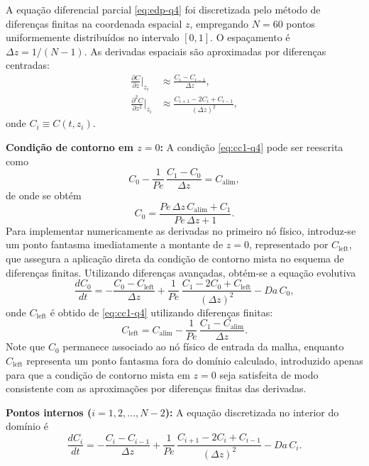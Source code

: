 \documentclass{article}
\begin{document}
A equação diferencial parcial \eqref{eq:edp-q4} foi discretizada pelo método de diferenças finitas na coordenada espacial $z$, empregando $N = 60$ pontos uniformemente distribuídos no intervalo $[0,1]$. O espaçamento é $\Delta z = 1/(N-1)$. As derivadas espaciais são aproximadas por diferenças centradas:
\begin{align}
  \frac{\partial C}{\partial z}\bigg|_{z_i} &\approx \frac{C_{i} - C_{i-1}}{\Delta z}, \label{eq:dz-q4} \\
  \frac{\partial^2 C}{\partial z^2}\bigg|_{z_i} &\approx \frac{C_{i+1} - 2C_i + C_{i-1}}{(\Delta z)^2}, \label{eq:d2z-q4}
\end{align}
onde $C_i \equiv C(t,z_i)$.

\textbf{Condição de contorno em $z=0$:} A condição \eqref{eq:cc1-q4} pode ser reescrita como
\begin{equation*}
  C_0 - \frac{1}{Pe}\,\frac{C_1 - C_0}{\Delta z} = C_{\text{alim}},
\end{equation*}
de onde se obtém
\begin{equation}
  C_0 = \frac{Pe\,\Delta z\,C_{\text{alim}} + C_1}{Pe\,\Delta z + 1}. \label{eq:c0-q4}
\end{equation}
Para implementar numericamente as derivadas no primeiro nó físico, introduz-se um ponto fantasma imediatamente a montante de $z=0$, representado por $C_{\text{left}}$, que assegura a aplicação direta da condição de contorno mista no esquema de diferenças finitas. Utilizando diferenças avançadas, obtém-se a equação evolutiva
\begin{equation}
  \frac{dC_0}{dt} = -\frac{C_0 - C_{\text{left}}}{\Delta z} + \frac{1}{Pe}\,\frac{C_1 - 2C_0 + C_{\text{left}}}{(\Delta z)^2} - Da\,C_0, \label{eq:dc0-q4}
\end{equation}
onde $C_{\text{left}}$ é obtido de \eqref{eq:cc1-q4} utilizando diferenças finitas:
\begin{equation}
  C_{\text{left}} = C_{\text{alim}} - \frac{1}{Pe}\,\frac{C_1 - C_{\text{alim}}}{\Delta z}. \label{eq:cleft-q4}
\end{equation}
Note que $C_0$ permanece associado ao nó físico de entrada da malha, enquanto $C_{\text{left}}$ representa um ponto fantasma fora do domínio calculado, introduzido apenas para que a condição de contorno mista em $z=0$ seja satisfeita de modo consistente com as aproximações por diferenças finitas das derivadas.

\textbf{Pontos internos ($i=1,2,\ldots,N-2$):} A equação discretizada no interior do domínio é
\begin{equation}
  \frac{dC_i}{dt} = -\frac{C_i - C_{i-1}}{\Delta z} + \frac{1}{Pe}\,\frac{C_{i+1} - 2C_i + C_{i-1}}{(\Delta z)^2} - Da\,C_i. \label{eq:dci-q4}
\end{equation}
\end{document}
